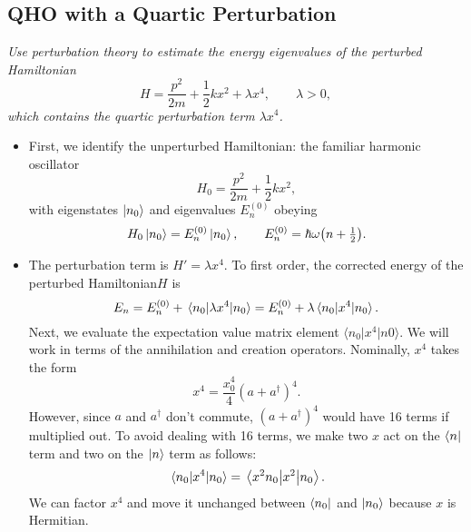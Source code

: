 \documentclass[11pt, a4paper]{article}
\newcommand{\Ham}{Hamiltonian\xspace}
\newcommand{\bmel}[3]{\big \langle {#1} \big | {#2} \big | {#3} \big \rangle}  %
\begin{document}
\subsection{QHO with a Quartic Perturbation}
\textit{Use perturbation theory to estimate the energy eigenvalues of the perturbed Hamiltonian}
\begin{equation*}
	H = \frac{p^{2}}{2m} + \frac{1}{2}kx^{2} + \lambda x^{4}, \qquad \lambda > 0,
\end{equation*}
\textit{which contains the quartic perturbation term $ \lambda x^{4} $.}

\begin{itemize}
	
	\item First, we identify the unperturbed Hamiltonian: the familiar harmonic oscillator
	\begin{equation*}
		H_{0} = \frac{p^{2}}{2m} + \frac{1}{2}kx^{2},
	\end{equation*}
	with eigenstates $ \ket{n_{0}} $ and eigenvalues $ E^{(0)}_{n} $ obeying
	\begin{equation*}
		H_{0} \ket{n_{0}} = E^{(0)}_{n} \ket{n_{0}}, \qquad E^{(0)}_{n} = \hbar \omega \big(n + \tfrac{1}{2}\big).
	\end{equation*}
	
	\item The perturbation term is $ H' = \lambda x^{4} $. To first order, the corrected energy of the perturbed \Ham $ H $ is
	\begin{equation*}
		E_{n} = E^{(0)}_{n} + \mel{n_{0}}{\lambda x^{4}}{n_{0}} = E^{(0)}_{n} + \lambda \mel{n_{0}}{x^{4}}{n_{0}}.
	\end{equation*}
	Next, we evaluate the expectation value matrix element $ \bmel{n_{0}}{x^{4}}{n0} $. We will work in terms of the annihilation and creation operators. Nominally, $ x^{4} $ takes the form
	\begin{equation*}
		x^{4} = \frac{x_{0}^{4}}{4}(a+a^{\dagger})^{4}.
	\end{equation*}
	However, since $ a $ and $ a^{\dagger} $ don't commute, $ (a+a^{\dagger})^{4} $ would have 16 terms if multiplied out.  To avoid dealing with 16 terms, we make two $ x $ act on the $ \bra{n} $ term and two on the $ \ket{n} $ term as follows:
	\begin{equation*}
		\mel{n_{0}}{x^{4}}{n_{0}} = \mel{x^{2}n_{0}}{x^{2}}{n_{0}}.
	\end{equation*}
	We can factor $ x^{4} $ and move it unchanged between $ \bra{n_{0}} $ and $ \ket{n_{0}} $ because $ x $ is Hermitian.
	

\end{itemize}
\end{document}
